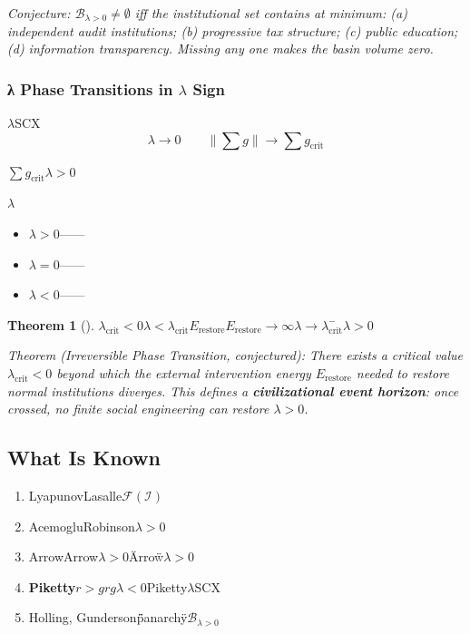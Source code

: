 \documentclass[12pt,a4paper]{article}
\newtheorem{theorem}{Theorem}[section]
\theoremstyle{remark}
\newcommand{\F}{\mathcal{F}}
\newcommand{\B}{\mathcal{B}}
\begin{document}
\medskip
\noindent\textit{Conjecture: $\B_{\lambda>0} \neq \emptyset$ iff the institutional set contains at minimum: (a) independent audit institutions; (b) progressive tax structure; (c) public education; (d) information transparency. Missing any one makes the basin volume zero.}

\subsubsection{λ Phase Transitions in $\lambda$ Sign}

$\lambda$\textbf{}SCX
\begin{equation}
    \lambda \to 0 \quad \text{} \quad \|\sum g\| \to \sum g_{\text{crit}}
\end{equation}

$\sum g_{\text{crit}}$$\lambda > 0$

$\lambda$
\begin{itemize}
    \item $\lambda > 0$——
    \item $\lambda = 0$——
    \item $\lambda < 0$——
\end{itemize}

\begin{theorem}[]
$\lambda_{\text{crit}} < 0$$\lambda < \lambda_{\text{crit}}$$E_{\text{restore}}$$E_{\text{restore}} \to \infty$$\lambda \to \lambda_{\text{crit}}^-$\textbf{}$\lambda > 0$
\end{theorem}

\medskip
\noindent\textit{Theorem (Irreversible Phase Transition, conjectured): There exists a critical value $\lambda_{\text{crit}} < 0$ beyond which the external intervention energy $E_{\text{restore}}$ needed to restore normal institutions diverges. This defines a \textbf{civilizational event horizon}: once crossed, no finite social engineering can restore $\lambda > 0$.}

\subsection{ What Is Known}

\begin{enumerate}[label=(\arabic*)]
    \item \textbf{}LyapunovLasalle$\F(\mathcal{I})$
    
    \item \textbf{}AcemogluRobinson$\lambda > 0$
    
    \item \textbf{}ArrowArrow$\lambda > 0$\"Arrow\"$\lambda > 0$
    
    \item \textbf{Piketty$r > g$}$r$$g$$\lambda < 0$Piketty$\lambda$SCX\textit{}
    
    \item \textbf{}Holling, Gunderson\"\"\"panarchy\"$\B_{\lambda>0}$
\end{enumerate}
\end{document}
